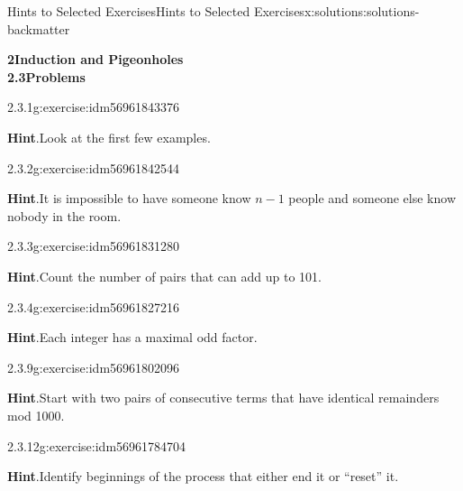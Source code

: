 \documentclass[twoside,10pt,]{book}
\newcommand{\blocktitlefont}{\relax}
\numberwithin{equation}{section}
\begin{document}
\begin{solutions-chapter}{Hints  to Selected Exercises}{}{Hints  to Selected Exercises}{}{}{x:solutions:solutions-backmatter}
\par\medskip
\noindent\textbf{\Large{}2\space\textperiodcentered\space{}Induction and Pigeonholes\\
2.3\space\textperiodcentered\space{}Problems}
\begin{divisionsolution}{2.3.1}{}{g:exercise:idm56961843376}%
\par\smallskip%
\noindent\textbf{\blocktitlefont Hint}.\hypertarget{g:hint:idm56961842080-back}{}\quad{}Look at the first few examples.%
\end{divisionsolution}%
\begin{divisionsolution}{2.3.2}{}{g:exercise:idm56961842544}%
\par\smallskip%
\noindent\textbf{\blocktitlefont Hint}.\hypertarget{g:hint:idm56961832304-back}{}\quad{}It is impossible to have someone know \(n-1\) people and someone else know nobody in the room.%
\end{divisionsolution}%
\begin{divisionsolution}{2.3.3}{}{g:exercise:idm56961831280}%
\par\smallskip%
\noindent\textbf{\blocktitlefont Hint}.\hypertarget{g:hint:idm56961829584-back}{}\quad{}Count the number of pairs that can add up to 101.%
\end{divisionsolution}%
\begin{divisionsolution}{2.3.4}{}{g:exercise:idm56961827216}%
\par\smallskip%
\noindent\textbf{\blocktitlefont Hint}.\hypertarget{g:hint:idm56961823632-back}{}\quad{}Each integer has a maximal odd factor.%
\end{divisionsolution}%
\begin{divisionsolution}{2.3.9}{}{g:exercise:idm56961802096}%
\par\smallskip%
\noindent\textbf{\blocktitlefont Hint}.\hypertarget{g:hint:idm56961795824-back}{}\quad{}Start with two pairs of consecutive terms that have identical remainders mod 1000.%
\end{divisionsolution}%
\begin{divisionsolution}{2.3.12}{}{g:exercise:idm56961784704}%
\par\smallskip%
\noindent\textbf{\blocktitlefont Hint}.\hypertarget{g:hint:idm56961783376-back}{}\quad{}Identify beginnings of the process that either end it or ``reset'' it.%
\end{divisionsolution}%

\end{solutions-chapter}
\end{document}
